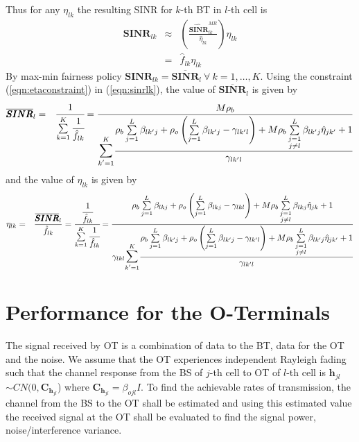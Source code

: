 \documentclass[10pt, a4paper, twoside,fleqn]{article}
\begin{document}
Thus for any $\eta_{lk}$ the resulting SINR for $k$-th BT in $l$-th cell is
\begin{eqnarray}\label{eqn:sinrlk}
\pmb{SINR}_{lk} &\approx & \left(\frac{\pmb{\widehat{SINR}}_{lk}^{MR}}{\hat \eta_{lk}}\right)\eta_{lk} \nonumber \\
                  &=& \hat f_{lk}\eta_{lk}   
\end{eqnarray}
By max-min fairness policy $\pmb{SINR}_{lk} = \overline{\pmb{SINR}}_{l} \ \forall \ k=1,\dotsc, K$. Using the constraint (\ref{eqn:etaconstraint}) in (\ref{eqn:sinrlk}), the value of $\overline{\pmb{SINR}}_{l}$ is given by
\begin{eqnarray}\label{eqn:sinrbar}
\overline{\pmb{SINR}}_{l} &=& \cfrac{1}{\sum\limits_{k=1}^K\cfrac{1}{\hat f_{lk}}}          =\frac{M\rho_b}{\mathlarger{\mathlarger{\sum}}\limits_{k'=1}^{K}\cfrac{\rho_b\sum\limits_{j=1}^{L}\beta_{lk'j}+\rho_o\left(\sum\limits_{j=1}^{L}\beta_{lk'j} -\gamma_{lk'l}\right)+M\rho_b\sum\limits_{\substack{j=1 \\ j \neq l}}^{L}\beta_{lk'j}\hat\eta_{jk'}+1}{\gamma_{lk'l}}}
\end{eqnarray}
 and the value of $\eta_{lk}$ is given by
\begin{eqnarray}\label{eqn:etalkgen}
\eta_{lk} &=& \frac{\overline{\pmb{SINR}}_{l}}{\hat f_{lk}}  = \cfrac{\cfrac{1}{\hat f_{lk}}}{\sum\limits_{k=1}^K\cfrac{1}{\hat f_{lk}}} =\frac{\rho_b\sum\limits_{j=1}^{L}\beta_{lkj}+\rho_o\left(\sum\limits_{j=1}^{L}\beta_{lkj} -\gamma_{lkl}\right)+M\rho_b\sum\limits_{\substack{j=1 \\ j \neq l}}^{L}\beta_{lkj}\hat\eta_{jk}+1}{\gamma_{lkl}\mathlarger{\mathlarger{\sum}}\limits_{k'=1}^{K}\cfrac{\rho_b\sum\limits_{j=1}^{L}\beta_{lk'j}+\rho_o\left(\sum\limits_{j=1}^{L}\beta_{lk'j} -\gamma_{lk'l}\right)+M\rho_b\sum\limits_{\substack{j=1 \\ j \neq l}}^{L}\beta_{lk'j}\hat\eta_{jk'}+1}{\gamma_{lk'l}}}
\end{eqnarray}

\section{Performance for the O-Terminals}
	The signal received by OT is a combination of data to the BT, data for the OT and the noise. We assume that the OT experiences independent Rayleigh fading such that the channel response from the BS of $j$-th cell to OT of $l$-th cell is $\pmb{h}_{jl}$ $\sim CN(0,\pmb{C}_{\pmb{h}_{jl}}$) where $\pmb{C}_{\pmb{h}_{jl}} = \beta_{ojl}I$. To find the achievable rates of transmission, the channel from the BS to the OT shall be estimated and using this estimated value the received signal at the OT shall be evaluated to find the signal power, noise/interference variance.
\end{document}
